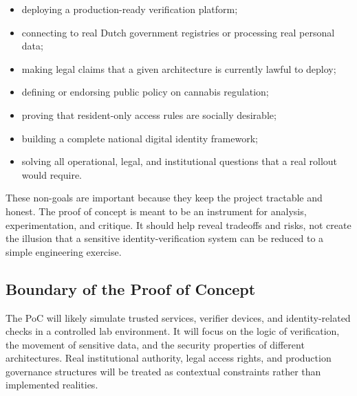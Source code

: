\begin{itemize}
    \item deploying a production-ready verification platform;
    \item connecting to real Dutch government registries or processing real personal data;
    \item making legal claims that a given architecture is currently lawful to deploy;
    \item defining or endorsing public policy on cannabis regulation;
    \item proving that resident-only access rules are socially desirable;
    \item building a complete national digital identity framework;
    \item solving all operational, legal, and institutional questions that a real rollout would require.
\end{itemize}

These non-goals are important because they keep the project tractable and honest. The proof of concept is meant to be an instrument for analysis, experimentation, and critique. It should help reveal tradeoffs and risks, not create the illusion that a sensitive identity-verification system can be reduced to a simple engineering exercise.

\subsection{Boundary of the Proof of Concept}

The PoC will likely simulate trusted services, verifier devices, and identity-related checks in a controlled lab environment. It will focus on the logic of verification, the movement of sensitive data, and the security properties of different architectures. Real institutional authority, legal access rights, and production governance structures will be treated as contextual constraints rather than implemented realities.